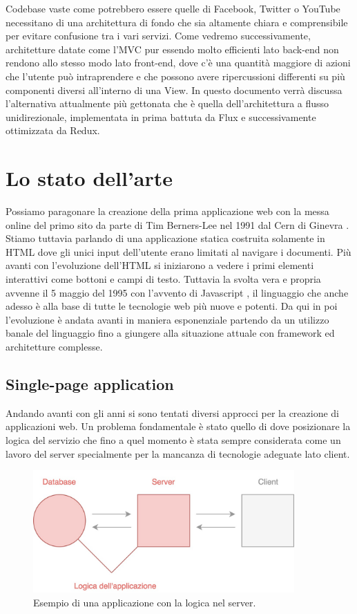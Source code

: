 \noindent
Codebase vaste come potrebbero essere quelle di Facebook, Twitter o YouTube necessitano di una architettura di fondo che sia altamente chiara e comprensibile per evitare confusione tra i vari servizi.
Come vedremo successivamente, architetture datate come l'MVC pur essendo molto efficienti lato back-end non rendono allo stesso modo lato front-end, dove c'è una quantità maggiore di azioni che l'utente può intraprendere e che possono avere ripercussioni differenti su più componenti diversi all'interno di una View.
In questo documento verrà discussa l'alternativa attualmente più gettonata che è quella dell'architettura a flusso unidirezionale, implementata in prima battuta da Flux e successivamente ottimizzata da Redux.

\section{Lo stato dell'arte}
Possiamo paragonare la creazione della prima applicazione web con la messa online del primo sito da parte di Tim Berners-Lee nel 1991 dal Cern di Ginevra \cite{HuffingtonpostFirstWebsite}. Stiamo tuttavia parlando di una applicazione statica costruita solamente in HTML dove gli unici input dell'utente erano limitati al navigare i documenti. Più avanti con l'evoluzione dell'HTML si iniziarono a vedere i primi elementi interattivi come bottoni e campi di testo. Tuttavia la svolta vera e propria avvenne il 5 maggio del 1995 con l'avvento di Javascript \cite{W3cJavascriptHistory}, il linguaggio che anche adesso è alla base di tutte le tecnologie web più nuove e potenti. Da qui in poi l'evoluzione è andata avanti in maniera esponenziale partendo da un utilizzo banale del linguaggio fino a giungere alla situazione attuale con framework ed architetture complesse.

\subsection{Single-page application}
Andando avanti con gli anni si sono tentati diversi approcci per la creazione di applicazioni web. Un problema fondamentale è stato quello di dove posizionare la logica del servizio che fino a quel momento è stata sempre considerata come un lavoro del server specialmente per la mancanza di tecnologie adeguate lato client.

\begin{figure}[h]
\centering
\includegraphics[width=10cm]{./images/noSPA}
\caption{Esempio di una applicazione con la logica nel server.}
\end{figure}

